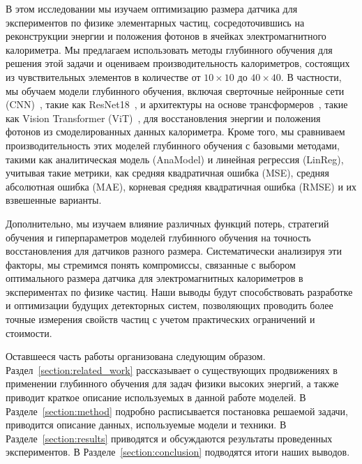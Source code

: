 \documentclass[a4paper,12pt]{extarticle}
\begin{document}

В этом исследовании мы изучаем оптимизацию размера датчика для экспериментов по физике элементарных частиц, сосредоточившись на реконструкции энергии и положения фотонов в ячейках электромагнитного калориметра. Мы предлагаем использовать методы глубинного обучения для решения этой задачи и оцениваем производительность калориметров, состоящих из чувствительных элементов в количестве от $10 \times 10$ до $40 \times 40$. В частности, мы обучаем модели глубинного обучения, включая сверточные нейронные сети (CNN)~\cite{oshea2015introduction}, такие как ResNet18~\cite{he2015deep}, и архитектуры на основе трансформеров~\cite{vaswani2023attention}, такие как Vision Transformer (ViT)~\cite{dosovitskiy2021image}, для восстановления энергии и положения фотонов из смоделированных данных калориметра. Кроме того, мы сравниваем производительность этих моделей глубинного обучения с базовыми методами, такими как аналитическая модель (AnaModel) и линейная регрессия (LinReg), учитывая такие метрики, как средняя квадратичная ошибка (MSE), средняя абсолютная ошибка (MAE), корневая средняя квадратичная ошибка (RMSE) и их взвешенные варианты.

Дополнительно, мы изучаем влияние различных функций потерь, стратегий обучения и гиперпараметров моделей глубинного обучения на точность восстановления для датчиков разного размера. Систематически анализируя эти факторы, мы стремимся понять компромиссы, связанные с выбором оптимального размера датчика для электромагнитных калориметров в экспериментах по физике частиц. Наши выводы будут способствовать разработке и оптимизации будущих детекторных систем, позволяющих проводить более точные измерения свойств частиц с учетом практических ограничений и стоимости.

Оставшееся часть работы организована следующим образом. Раздел~\ref{section:related_work} рассказывает о существующих продвижениях в применении глубинного обучения для задач физики высоких энергий, а также приводит краткое описание используемых в данной работе моделей. В Разделе~\ref{section:method} подробно расписывается постановка решаемой задачи, приводится описание данных, используемые модели и техники. В Разделе~\ref{section:results} приводятся и обсуждаются результаты проведенных экспериментов. В Разделе~\ref{section:conclusion} подводятся итоги наших выводов.
\end{document}
